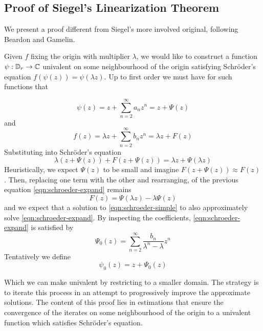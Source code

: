 \documentclass[../main.tex]{subfiles}
\begin{document}
\subsection{Proof of Siegel's Linearization Theorem}

We present a proof different from Siegel's more involved original, following Beardon and Gamelin.


Given $f$ fixing the origin with multiplier $\lambda$, we would like to construct a function $\psi : \mathbb{D}_r \to \mathbb{C}$ univalent on some neighbourhood of the origin satisfying Schröder's equation $f(\psi(z)) = \psi(\lambda z)$. Up to first order we must have for such functions that

\[
\psi(z) = z + \sum_{n=2}^\infty a_nz^n = z + \Psi(z)
\]
and
\[
f(z) = \lambda z + \sum_{n=2}^\infty b_n z^n = \lambda z + F(z)
\]
Substituting into Schröder's equation
\begin{equation}\label{eqn:schroeder-expand}
    \lambda(z + \Psi(z)) + F(z + \Psi(z)) = \lambda z + \Psi(\lambda z)
\end{equation}
Heuristically, we expect $\Psi(z)$ to be small and imagine $F(z + \Psi(z)) \approx F(z)$. Then, replacing one term with the other and rearranging, of the previous equation \eqref{eqn:schroeder-expand} remains
\begin{equation}\label{eqn:schroeder-simple}
     F(z) = \Psi(\lambda z) - \lambda\Psi(z)
\end{equation}
and we expect that a solution to \eqref{eqn:schroeder-simple} to also approximately solve \eqref{eqn:schroeder-expand}. By inspecting the coefficients, \eqref{eqn:schroeder-expand} is satisfied by
\begin{equation*}
    \Psi_0(z) = \sum_{n=2}^\infty \frac{b_n}{\lambda^n - \lambda}z^n
\end{equation*}
Tentatively we define
\begin{equation}
    \psi_0(z) = z + \Psi_0(z)
\end{equation}

Which we can make univalent by restricting to a smaller domain. The strategy is to iterate this process in an attempt to progressively improve the approximate solutions. The content of this proof lies in estimations that ensure the convergence of the iterates on some neighbourhood of the origin to a univalent function which satisfies Schröder's equation.
\end{document}
